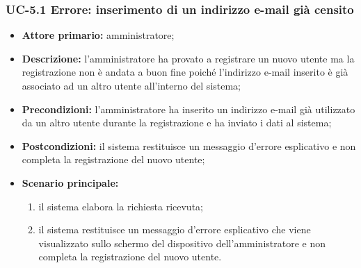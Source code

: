 \subsubsection{UC-5.1 Errore: inserimento di un indirizzo e-mail già censito}
\begin{itemize}
	\item \textbf{Attore primario:} amministratore;

	\item \textbf{Descrizione:} l'amministratore ha provato a registrare un nuovo utente ma la registrazione non è andata a buon fine poiché l'indirizzo e-mail inserito è già associato ad un altro utente all'interno del sistema;

	\item \textbf{Precondizioni:} l'amministratore ha inserito un indirizzo e-mail già utilizzato da un altro utente durante la registrazione e ha inviato i dati al sistema;

	\item \textbf{Postcondizioni:} il sistema restituisce un messaggio d'errore esplicativo e non completa la registrazione del nuovo utente;

	\item \textbf{Scenario principale:}
	      \begin{enumerate}
		      \item il sistema elabora la richiesta ricevuta;
		      \item il sistema restituisce un messaggio d'errore esplicativo che viene visualizzato sullo schermo del dispositivo dell'amministratore e non completa la registrazione del nuovo utente.
	      \end{enumerate}
\end{itemize}

